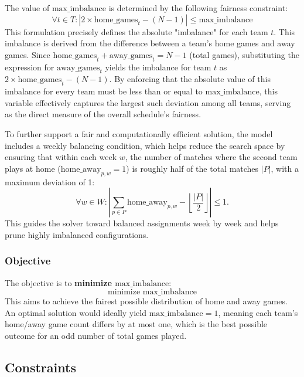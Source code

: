 The value of $\text{max\_imbalance}$ is determined by the following fairness constraint:
\[ \forall t \in T : \left| 2 \times \text{home\_games}_{t} - (N-1) \right| \leq \text{max\_imbalance} \]
This formulation precisely defines the absolute "imbalance" for each team $t$. This imbalance is derived from the difference between a team's home games and away games. Since $\text{home\_games}_{t} + \text{away\_games}_{t} = N-1$ (total games), substituting the expression for $\text{away\_games}_{t}$ yields the imbalance for team $t$ as $2 \times \text{home\_games}_{t} - (N-1)$. By enforcing that the absolute value of this imbalance for every team must be less than or equal to $\text{max\_imbalance}$, this variable effectively captures the largest such deviation among all teams, serving as the direct measure of the overall schedule's fairness.

To further support a fair and computationally efficient solution, the model includes a weekly balancing condition, which helps reduce the search space by ensuring that within each week $w$, the number of matches where the second team plays at home ($\text{home\_away}_{p, w} = 1$) is roughly half of the total matches $|P|$, with a maximum deviation of 1:
\[
\forall w \in W : \left| \sum_{p \in P} \text{home\_away}_{p, w} - \left\lfloor \frac{|P|}{2} \right\rfloor \right| \leq 1.
\]
This guides the solver toward balanced assignments week by week and helps prune highly imbalanced configurations.

\subsubsection{Objective}
The objective is to \textbf{minimize $\text{max\_imbalance}$}:
\[ \text{minimize } \text{max\_imbalance} \]
This aims to achieve the fairest possible distribution of home and away games. An optimal solution would ideally yield $\text{max\_imbalance}=1$, meaning each team's home/away game count differs by at most one, which is the best possible outcome for an odd number of total games played.


\subsection{Constraints}
